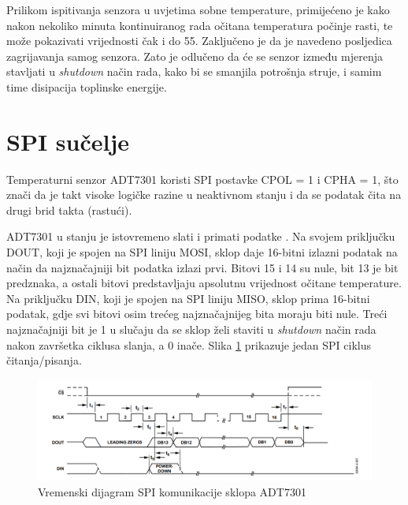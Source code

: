 	Prilikom ispitivanja senzora u uvjetima sobne temperature, primijećeno je kako nakon nekoliko minuta kontinuiranog rada očitana temperatura počinje rasti, te može pokazivati vrijednosti čak i do 55\textcelsius{}. Zaključeno je da je navedeno posljedica zagrijavanja samog senzora. Zato je odlučeno da će se senzor između mjerenja stavljati u \textit{shutdown} način rada, kako bi se smanjila potrošnja struje, i samim time disipacija toplinske energije.

\section{SPI sučelje}
	Temperaturni senzor ADT7301 koristi SPI postavke CPOL = 1 i CPHA = 1, što znači da je takt visoke logičke razine u neaktivnom stanju i da se podatak čita na drugi brid takta (rastući).
	
	ADT7301 u stanju je istovremeno slati i primati podatke . Na svojem priključku DOUT, koji je spojen na SPI liniju MOSI, sklop daje 16-bitni izlazni podatak na način da najznačajniji bit podatka izlazi prvi. Bitovi 15 i 14 su nule, bit 13 je bit predznaka, a ostali bitovi predstavljaju apsolutnu vrijednost očitane temperature. Na priključku DIN, koji je spojen na SPI liniju MISO, sklop prima 16-bitni podatak, gdje svi bitovi osim trećeg najznačajnijeg bita moraju biti nule. Treći najznačajniji bit je 1 u slučaju da se sklop želi staviti u \textit{shutdown} način rada nakon završetka ciklusa slanja, a 0 inače. Slika \ref{fig:adt7301_spi} prikazuje jedan SPI ciklus čitanja/pisanja.
	
	\begin{figure}[htb]
		\centering
		\includegraphics{slike/ADT7301_spi.png}
		\caption{Vremenski dijagram SPI komunikacije sklopa ADT7301}
		\label{fig:adt7301_spi}
	\end{figure}
	